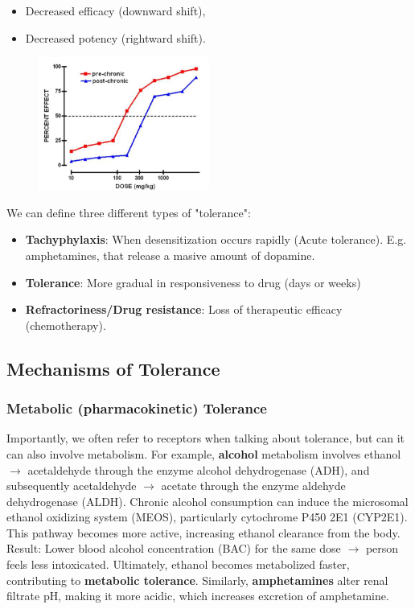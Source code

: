 \documentclass{book}
\begin{document}
\begin{itemize}
    \item Decreased efficacy (downward shift),
    \item Decreased potency (rightward shift).
\end{itemize}

\begin{figure}[H]
   \centering
   \includegraphics[width=0.5\textwidth]{images3/image.png}
\end{figure}

We can define three different types of "tolerance":
\begin{itemize}
    \item \textbf{Tachyphylaxis}: When desensitization occurs rapidly (Acute tolerance). E.g. amphetamines, that release a masive amount of dopamine.
    \item \textbf{Tolerance}: More gradual in responsiveness to drug (days or weeks)
    \item \textbf{Refractoriness/Drug resistance}: Loss of therapeutic efficacy (chemotherapy).
\end{itemize}

\subsection{Mechanisms of Tolerance}
\subsubsection{Metabolic (pharmacokinetic) Tolerance}
Importantly, we often refer to receptors when talking about tolerance, but can it can also involve metabolism. 
For example, \textbf{alcohol} metabolism involves ethanol $\rightarrow$ acetaldehyde through the enzyme alcohol dehydrogenase (ADH), and subsequently acetaldehyde $\rightarrow$ acetate through the enzyme
aldehyde dehydrogenase (ALDH). 
Chronic alcohol consumption can induce the microsomal ethanol oxidizing system (MEOS), particularly cytochrome P450 2E1 (CYP2E1).
This pathway becomes more active, increasing ethanol clearance from the body.
Result: Lower blood alcohol concentration (BAC) for the same dose $\rightarrow$ person feels less intoxicated.
Ultimately, ethanol becomes metabolized faster, contributing to \textbf{metabolic tolerance}.
Similarly, \textbf{amphetamines} alter renal filtrate pH, making it more acidic, which increases excretion of amphetamine.
\end{document}
